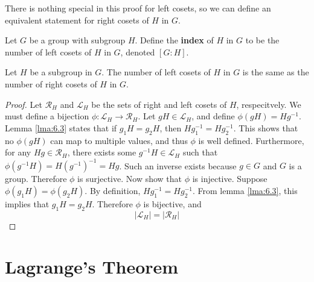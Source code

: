 \documentclass[12pt, letterpaper]{report}
\begin{document}
There is nothing special in this proof for left cosets, so we can define an equivalent statement for right cosets of \(H\) in \(G\).
\begin{definition}[Index]
	Let \(G\) be a group with subgroup \(H\). Define the \textbf{index} of \(H\) in \(G\) to be the number of left cosets of \(H\) in \(G\), denoted \([G:H]\).
\end{definition}
\begin{theorem}
	Let \(H\) be a subgroup in \(G\). The number of left cosets of \(H\) in \(G\) is the same as the number of right cosets of \(H\) in \(G\).
\end{theorem}
\begin{proof}
	Let \(\mathcal{R} _H\) and \(\mathcal{L} _H\) be the sets of right and left cosets of \(H\), respecitvely. We must define a bijection \(\phi :\mathcal{L} _H \to \mathcal{R} _H\). Let \(gH\in \mathcal{L}_H\), and define \(\phi (gH)=Hg^{-1} \). Lemma \ref{lma:6.3} states that if \(g_1 H = g_2 H\), then \(H g^{-1} _1 = H g^{-1} _2\). This shows that no \(\phi (gH)\) can map to multiple values, and thus \(\phi \) is well defined. Furthermore, for any \(Hg\in \mathcal{R} _H\), there exists some \(g^{-1} H\in \mathcal{L} _H\) such that \(\phi \left( g^{-1} H \right)=H (g^{-1}) ^{-1} =Hg \). Such an inverse exists because \(g\in G\) and \(G\) is a group. Therefore \(\phi \) is surjective. Now show that \(\phi \) is injective. Suppose \(\phi (g_1 H)=\phi (g_2 H)\). By definition, \(H g^{-1} _1 =H g^{-1} _2\). From lemma \ref{lma:6.3}, this implies that \(g_1 H = g_2 H\). Therefore \(\phi \) is bijective, and
	\[
		\left\vert \mathcal{L} _H \right\vert = \left\vert \mathcal{R} _H \right\vert 
	\]
\end{proof}
\section{Lagrange's Theorem}
\end{document}
